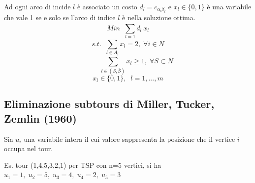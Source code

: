 Ad ogni arco di incide $l$ è associato un costo $d_{l}=c_{\alpha_{l}\beta_{l}}$ e $x_{l}\in \{0,1\}$ è una variabile che vale 1 se e solo se l'arco di indice $l$ è nella soluzione ottima.
\begin{equation}
	Min\;\;\displaystyle\sum_{l=1}^{} d_{l}\:x_{l}
\end{equation}
\begin{equation}
	s.t.\;\;\displaystyle\sum_{l\in A_{i}}^{} x_{l}=2,\; \forall i\in N
\end{equation}
\begin{equation}
	\;\;\;\;\;\;\;\;\;\displaystyle\sum_{l\in (S, \bar{S})}^{} x_{l} \ge 1,\;\forall S \subset N
\end{equation}
\begin{equation}
	x_{l}\in \{0,1\},\;\;l=1,...,m
\end{equation}

\subsection{Eliminazione subtours di Miller, Tucker, Zemlin (1960)}
Sia $u_{i}$ una variabile intera il cui valore sappresenta la posizione che il vertice $i$ occupa nel tour.

\begin{center}
	Es. tour (1,4,5,3,2,1) per TSP con n=5 vertici, si ha $u_{1}=1,\;u_{2}=5,\;u_{3}=4,\;u_{4}=2,\;u_{5}=3$	
\end{center}

